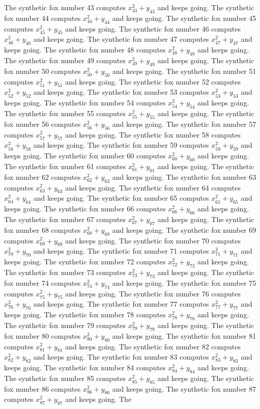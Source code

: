 \documentclass{article}
\begin{document}
The synthetic fox number 43 computes $x_{43}^2 + y_{43}$ and keeps going. The synthetic fox number 44 computes $x_{44}^2 + y_{44}$ and keeps going. The synthetic fox number 45 computes $x_{45}^2 + y_{45}$ and keeps going. The synthetic fox number 46 computes $x_{46}^2 + y_{46}$ and keeps going. The synthetic fox number 47 computes $x_{47}^2 + y_{47}$ and keeps going. The synthetic fox number 48 computes $x_{48}^2 + y_{48}$ and keeps going. The synthetic fox number 49 computes $x_{49}^2 + y_{49}$ and keeps going. The synthetic fox number 50 computes $x_{50}^2 + y_{50}$ and keeps going. The synthetic fox number 51 computes $x_{51}^2 + y_{51}$ and keeps going. The synthetic fox number 52 computes $x_{52}^2 + y_{52}$ and keeps going. The synthetic fox number 53 computes $x_{53}^2 + y_{53}$ and keeps going. The synthetic fox number 54 computes $x_{54}^2 + y_{54}$ and keeps going. The synthetic fox number 55 computes $x_{55}^2 + y_{55}$ and keeps going. The synthetic fox number 56 computes $x_{56}^2 + y_{56}$ and keeps going. The synthetic fox number 57 computes $x_{57}^2 + y_{57}$ and keeps going. The synthetic fox number 58 computes $x_{58}^2 + y_{58}$ and keeps going. The synthetic fox number 59 computes $x_{59}^2 + y_{59}$ and keeps going. The synthetic fox number 60 computes $x_{60}^2 + y_{60}$ and keeps going. The synthetic fox number 61 computes $x_{61}^2 + y_{61}$ and keeps going. The synthetic fox number 62 computes $x_{62}^2 + y_{62}$ and keeps going. The synthetic fox number 63 computes $x_{63}^2 + y_{63}$ and keeps going. The synthetic fox number 64 computes $x_{64}^2 + y_{64}$ and keeps going. The synthetic fox number 65 computes $x_{65}^2 + y_{65}$ and keeps going. The synthetic fox number 66 computes $x_{66}^2 + y_{66}$ and keeps going. The synthetic fox number 67 computes $x_{67}^2 + y_{67}$ and keeps going. The synthetic fox number 68 computes $x_{68}^2 + y_{68}$ and keeps going. The synthetic fox number 69 computes $x_{69}^2 + y_{69}$ and keeps going. The synthetic fox number 70 computes $x_{70}^2 + y_{70}$ and keeps going. The synthetic fox number 71 computes $x_{71}^2 + y_{71}$ and keeps going. The synthetic fox number 72 computes $x_{72}^2 + y_{72}$ and keeps going. The synthetic fox number 73 computes $x_{73}^2 + y_{73}$ and keeps going. The synthetic fox number 74 computes $x_{74}^2 + y_{74}$ and keeps going. The synthetic fox number 75 computes $x_{75}^2 + y_{75}$ and keeps going. The synthetic fox number 76 computes $x_{76}^2 + y_{76}$ and keeps going. The synthetic fox number 77 computes $x_{77}^2 + y_{77}$ and keeps going. The synthetic fox number 78 computes $x_{78}^2 + y_{78}$ and keeps going. The synthetic fox number 79 computes $x_{79}^2 + y_{79}$ and keeps going. The synthetic fox number 80 computes $x_{80}^2 + y_{80}$ and keeps going. The synthetic fox number 81 computes $x_{81}^2 + y_{81}$ and keeps going. The synthetic fox number 82 computes $x_{82}^2 + y_{82}$ and keeps going. The synthetic fox number 83 computes $x_{83}^2 + y_{83}$ and keeps going. The synthetic fox number 84 computes $x_{84}^2 + y_{84}$ and keeps going. The synthetic fox number 85 computes $x_{85}^2 + y_{85}$ and keeps going. The synthetic fox number 86 computes $x_{86}^2 + y_{86}$ and keeps going. The synthetic fox number 87 computes $x_{87}^2 + y_{87}$ and keeps going. The 
\end{document}
